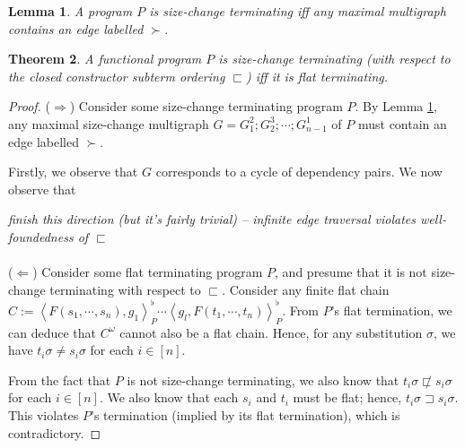 \documentclass{article}
\newtheorem{theorem}{Theorem}%
\newtheorem{lemma}[theorem]{Lemma}
\theoremstyle{definition}
\newcommand{\dpair}[2]{\left\langle #1, #2 \right\rangle}
\newcommand{\subterm}{\sqsubset}
\newcommand{\supterm}{\sqsupset}
\begin{document}
\begin{lemma} \label{thm:size_change_max_multi}
    A program $P$ is size-change terminating iff any maximal multigraph contains an edge labelled $\succ$.
\end{lemma}

\begin{theorem}
    A functional program $P$ is size-change terminating (with respect to the closed constructor subterm ordering $\subterm$) iff it is flat terminating.
\end{theorem}

\begin{proof}
    ($\Rightarrow$) Consider some size-change terminating program $P$. By Lemma \ref{thm:size_change_max_multi}, any maximal size-change multigraph $G = G_1^2; G_2^3; \cdots ; G_{n-1}^1$ of $P$ must contain an edge labelled $\succ$. 

    Firstly, we observe that $G$ corresponds to a cycle of dependency pairs. We now observe that  
    
    \emph{finish this direction (but it's fairly trivial) -- infinite edge traversal violates well-foundedness of $\subterm$}
    \\~\\
    ($\Leftarrow$) Consider some flat terminating program $P$, and presume that it is not size-change terminating with respect to $\subterm$. Consider any finite flat chain $C := \dpair{F(s_1, \cdots, s_n)}{g_1}_P^\flat \cdots \dpair{g_l}{ F(t_1, \cdots, t_n)}_P^\flat$. From $P$'s flat termination, we can deduce that $C^\omega$ cannot also be a flat chain. Hence, for any substitution $\sigma$, we have $t_i \sigma \neq s_i \sigma$ for each $i \in [n]$. 

    From the fact that $P$ is not size-change terminating, we also know that $t_i \sigma \not \subterm s_i \sigma$ for each $i \in [n]$. We also know that each $s_i$ and $t_i$ must be flat; hence, $t_i\sigma \supterm s_i\sigma$. This violates $P$'s termination (implied by its flat termination), which is contradictory.  
\end{proof}

    
\end{document}
